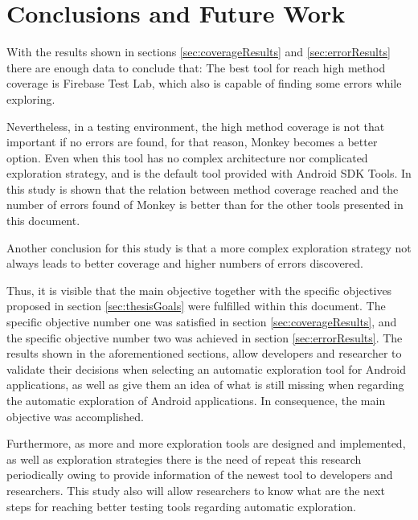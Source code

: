 
\chapter{Conclusions and Future Work} %
\label{Chapter5}

With the results shown in sections \ref{sec:coverageResults} and \ref{sec:errorResults} there are enough data to conclude that: The best tool for reach high method coverage is Firebase Test Lab, which also is capable of finding some errors while exploring.

Nevertheless, in a testing environment, the high method coverage is not that important if no errors are found, for that reason, Monkey becomes a better option. Even when this tool has no complex architecture nor complicated exploration strategy, and is the default tool provided with Android SDK Tools. In this study is shown that the relation between method coverage reached and the number of errors found of Monkey is better than for the other tools presented in this document. 

Another conclusion for this study is that a more complex exploration strategy not always leads to better coverage and higher numbers of errors discovered.

Thus, it is visible that the main objective together with the specific objectives proposed in section \ref{sec:thesisGoals} were fulfilled within this document. The specific objective number one was satisfied in section \ref{sec:coverageResults}, and the specific objective number two was achieved in section \ref{sec:errorResults}. The results shown in the aforementioned sections, allow developers and researcher to validate their decisions when selecting an automatic exploration tool for Android applications, as well as give them an idea of what is still missing when regarding the automatic exploration of Android applications. In consequence, the main objective was accomplished.

Furthermore, as more and more exploration tools are designed and implemented, as well as exploration strategies there is the need of repeat this research periodically owing to provide information of the newest tool to developers and researchers. This study also will allow researchers to know what are the next steps for reaching better testing tools regarding automatic exploration. 

